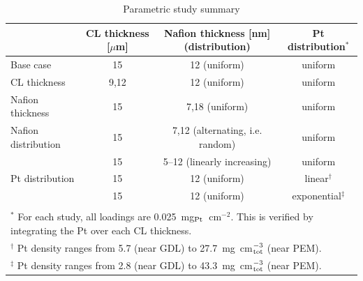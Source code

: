 \documentclass[final,3p,times,twocolumn]{elsarticle}    %
\begin{document}
\begin{table}[!htb]
    \small
    \centering
    \caption{Parametric study summary}
    \vspace*{1mm}

    \begin{tabular}{l c c c}
    \hline \hline
    & CL thickness [$\mu$m] & Nafion thickness [nm] (distribution)  & Pt distribution$^{*}$ \\
    \hline 
    Base case           & 15    & 12 (uniform)                      & uniform \\
    CL thickness        & 9,12  & 12 (uniform)                      & uniform \\
    Nafion thickness    & 15    & 7,18 (uniform)                    & uniform \\
    Nafion distribution & 15    & 7,12 (alternating, i.e. random)   & uniform \\ 
                        & 15    & 5--12 (linearly increasing)       & uniform \\ 
    Pt distribution  & 15    & 12 (uniform)                         & linear$^{\dagger}$ \\ 
                     & 15    & 12 (uniform)                         & exponential$^{\ddagger}$ \\ 
    \hline \hline \vspace*{-3mm} \\
    \multicolumn{4}{l}{$^{*}$ For each study, all loadings are 0.025~mg$_{\rm Pt}$~cm$^{-2}$. This is verified by integrating the Pt over each CL thickness.} \\
    \multicolumn{4}{l}{$^{\dagger}$ Pt density ranges from 5.7 (near GDL) to 27.7~mg~cm$^{-3}_{\rm tot}$ (near PEM).} \\
    \multicolumn{4}{l}{$^{\ddagger}$ Pt density ranges from 2.8 (near GDL) to 43.3~mg~cm$^{-3}_{\rm tot}$ (near PEM).}
    \end{tabular}
    \label{tab:design-study}
\end{table}
\end{document}

